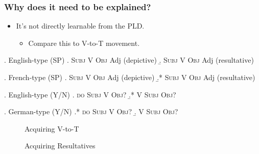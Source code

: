 \documentclass[Proposal]{subfiles}
\begin{document}
\begin{frame}
  \frametitle{Why does it need to be explained?}
  \begin{itemize}
    \item It's not directly learnable from the PLD.
      \begin{itemize}
	\item<3-|handout:2-> Compare this to V-to-T movement.
      \end{itemize}
  \end{itemize}
  \begin{overprint}
    \ex. English-type (SP)
    \a. \textsc{Subj} V \textsc{Obj} Adj (depictive)
    \b. \textsc{Subj} V \textsc{Obj} Adj (resultative)

    \ex. French-type (SP)
    \a. \textsc{Subj} V \textsc{Obj} Adj (depictive)
    \b.* \textsc{Subj} V \textsc{Obj} Adj (resultative)

    \ex. English-type (Y/N)
    \a. \textsc{do Subj} V \textsc{Obj}? 
    \b.* V \textsc{Subj} \textsc{Obj}?

    \ex. German-type (Y/N)
    \a.* \textsc{do Subj} V \textsc{Obj}? 
    \b. V \textsc{Subj} \textsc{Obj}?

    \begin{figure}[h]
      \centering
      \caption{Acquiring V-to-T}
      \label{fig:VtoTAcq}
    \end{figure}
    \begin{figure}[h]
      \centering
      \caption{Acquiring Resultatives}
      \label{fig:resAcq}
    \end{figure}
  \end{overprint}
\end{frame}
\end{document}
